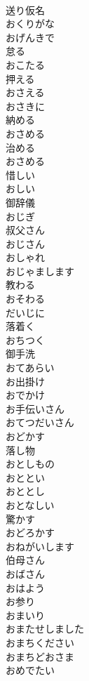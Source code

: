\documentclass[8pt]{extreport}
\begin{document}
\begin{CJK}{UTF8}{min}
\\	送り仮名 
\\	おくりがな	
\\	おげんきで	
\\	怠る 
\\	おこたる	
\\	押える 
\\	おさえる	
\\	おさきに	
\\	納める 
\\	おさめる	
\\	治める 
\\	おさめる	
\\	惜しい 
\\	おしい	
\\	御辞儀 
\\	おじぎ	
\\	叔父さん 
\\	おじさん	
\\	おしゃれ	
\\	おじゃまします	
\\	教わる 
\\	おそわる	
\\	だいじに	
\\	落着く 
\\	おちつく	
\\	御手洗 
\\	おてあらい	
\\	お出掛け 
\\	おでかけ	
\\	お手伝いさん 
\\	おてつだいさん	
\\	おどかす	
\\	落し物 
\\	おとしもの	
\\	おととい	
\\	おととし	
\\	おとなしい	
\\	驚かす 
\\	おどろかす	
\\	おねがいします	
\\	伯母さん 
\\	おばさん	
\\	おはよう	
\\	お参り 
\\	おまいり	
\\	おまたせしました	
\\	おまちください	
\\	おまちどおさま	
\\	おめでたい	

\end{CJK}
\end{document}
